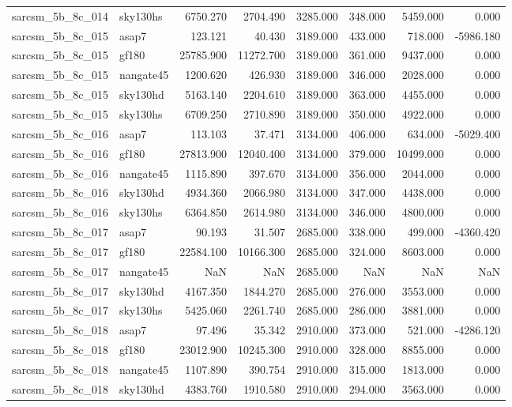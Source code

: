 \begin{tabular}{llrrrrrr}
sarcsm\_5b\_8c\_014 & sky130hs & 6750.270 & 2704.490 & 3285.000 & 348.000 & 5459.000 & 0.000 \\
sarcsm\_5b\_8c\_015 & asap7 & 123.121 & 40.430 & 3189.000 & 433.000 & 718.000 & -5986.180 \\
sarcsm\_5b\_8c\_015 & gf180 & 25785.900 & 11272.700 & 3189.000 & 361.000 & 9437.000 & 0.000 \\
sarcsm\_5b\_8c\_015 & nangate45 & 1200.620 & 426.930 & 3189.000 & 346.000 & 2028.000 & 0.000 \\
sarcsm\_5b\_8c\_015 & sky130hd & 5163.140 & 2204.610 & 3189.000 & 363.000 & 4455.000 & 0.000 \\
sarcsm\_5b\_8c\_015 & sky130hs & 6709.250 & 2710.890 & 3189.000 & 350.000 & 4922.000 & 0.000 \\
sarcsm\_5b\_8c\_016 & asap7 & 113.103 & 37.471 & 3134.000 & 406.000 & 634.000 & -5029.400 \\
sarcsm\_5b\_8c\_016 & gf180 & 27813.900 & 12040.400 & 3134.000 & 379.000 & 10499.000 & 0.000 \\
sarcsm\_5b\_8c\_016 & nangate45 & 1115.890 & 397.670 & 3134.000 & 356.000 & 2044.000 & 0.000 \\
sarcsm\_5b\_8c\_016 & sky130hd & 4934.360 & 2066.980 & 3134.000 & 347.000 & 4438.000 & 0.000 \\
sarcsm\_5b\_8c\_016 & sky130hs & 6364.850 & 2614.980 & 3134.000 & 346.000 & 4800.000 & 0.000 \\
sarcsm\_5b\_8c\_017 & asap7 & 90.193 & 31.507 & 2685.000 & 338.000 & 499.000 & -4360.420 \\
sarcsm\_5b\_8c\_017 & gf180 & 22584.100 & 10166.300 & 2685.000 & 324.000 & 8603.000 & 0.000 \\
sarcsm\_5b\_8c\_017 & nangate45 & NaN & NaN & 2685.000 & NaN & NaN & NaN \\
sarcsm\_5b\_8c\_017 & sky130hd & 4167.350 & 1844.270 & 2685.000 & 276.000 & 3553.000 & 0.000 \\
sarcsm\_5b\_8c\_017 & sky130hs & 5425.060 & 2261.740 & 2685.000 & 286.000 & 3881.000 & 0.000 \\
sarcsm\_5b\_8c\_018 & asap7 & 97.496 & 35.342 & 2910.000 & 373.000 & 521.000 & -4286.120 \\
sarcsm\_5b\_8c\_018 & gf180 & 23012.900 & 10245.300 & 2910.000 & 328.000 & 8855.000 & 0.000 \\
sarcsm\_5b\_8c\_018 & nangate45 & 1107.890 & 390.754 & 2910.000 & 315.000 & 1813.000 & 0.000 \\
sarcsm\_5b\_8c\_018 & sky130hd & 4383.760 & 1910.580 & 2910.000 & 294.000 & 3563.000 & 0.000 \\

\end{tabular}

